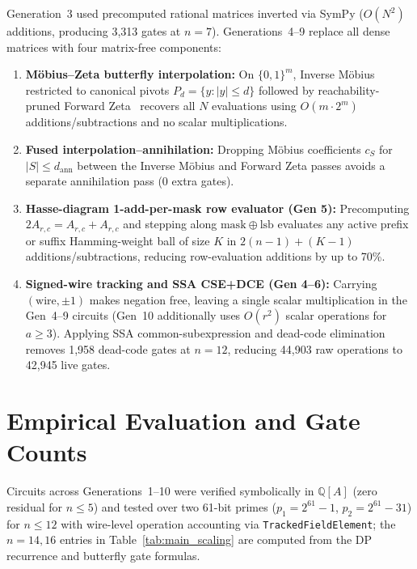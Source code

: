 \documentclass[11pt,a4paper]{article}
\newcommand{\wt}[1]{|#1|}
\begin{document}
Generation~3 used precomputed rational matrices inverted via SymPy ($O(N^2)$ additions, producing 3,313 gates at $n=7$). Generations~4--9 replace all dense matrices with four matrix-free components:
\begin{enumerate}
  \item \textbf{M\"obius--Zeta butterfly interpolation:} On $\{0,1\}^m$, Inverse M\"obius restricted to canonical pivots $P_d = \{y : \wt{y} \le d\}$ followed by reachability-pruned Forward Zeta~\cite{bhkk2007} recovers all $N$ evaluations using $O(m \cdot 2^m)$ additions/subtractions and no scalar multiplications.
  \item \textbf{Fused interpolation--annihilation:} Dropping M\"obius coefficients $c_S$ for $\wt{S} \le d_{\mathrm{ann}}$ between the Inverse M\"obius and Forward Zeta passes avoids a separate annihilation pass (0 extra gates).
  \item \textbf{Hasse-diagram 1-add-per-mask row evaluator (Gen 5):} Precomputing $2 A_{r,c} = A_{r,c} + A_{r,c}$ and stepping along $\mathrm{mask} \oplus \mathrm{lsb}$ evaluates any active prefix or suffix Hamming-weight ball of size $K$ in $2(n-1) + (K - 1)$ additions/subtractions, reducing row-evaluation additions by up to 70\%.
  \item \textbf{Signed-wire tracking and SSA CSE+DCE (Gen 4--6):} Carrying $(\text{wire}, \pm 1)$ makes negation free, leaving a single scalar multiplication in the Gen~4--9 circuits (Gen~10 additionally uses $O(r^2)$ scalar operations for $a \ge 3$). Applying SSA common-subexpression and dead-code elimination removes 1,958 dead-code gates at $n = 12$, reducing 44,903 raw operations to 42,945 live gates.
\end{enumerate}

\section{Empirical Evaluation and Gate Counts}

Circuits across Generations~1--10 were verified symbolically in $\mathbb{Q}[A]$ (zero residual for $n \le 5$) and tested over two 61-bit primes ($p_1 = 2^{61}-1$, $p_2 = 2^{61}-31$) for $n \le 12$ with wire-level operation accounting via \texttt{TrackedFieldElement}; the $n = 14, 16$ entries in Table~\ref{tab:main_scaling} are computed from the DP recurrence and butterfly gate formulas.
\end{document}
